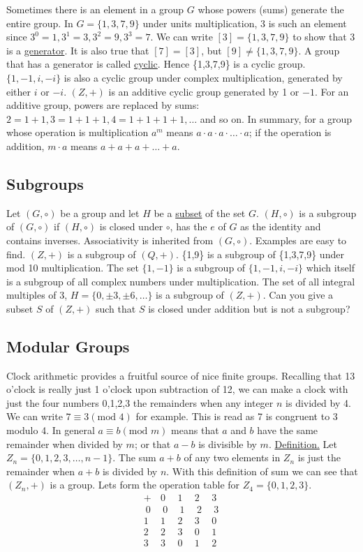 \documentclass[12pt]{book}
\theoremstyle{definition}
\begin{document}
Sometimes there is an element in a group $G$ whose powers (sums) generate the entire group.  In $G=\{1,3,7,9\}$ under units multiplication, 3 is such an element since $3^0=1, 3^1=3, 3^2=9, 3^3=7$.  We can write $[3]=\{1,3,7,9\}$ to show that 3 is a \underline{generator}.  It is also true that $[7]=[3]$, but $[9]\neq\{1,3,7,9\}$.  A group that has a generator is called \underline{cyclic}.  Hence \{1,3,7,9\} is a cyclic group. $\{1,-1,i,-i\}$ is also a cyclic group under complex multiplication, generated by either $i$ or $-i$.  $(Z,+)$ is an additive cyclic group generated by 1 or $-1$.  For an additive group, powers are replaced by sums: $2=1+1, 3=1+1+1, 4=1+1+1+1, \dots$ and so on.  In summary, for a group whose operation is multiplication $a^m$ means $a\cdot a \cdot a\cdot\dots\cdot a$; if the operation is addition, $m\cdot a$ means $a+a+a+\dots+a$.

\subsection{Subgroups}

Let $(G,\circ)$ be a group and let $H$ be a \underline{subset} of the set $G$.  $(H,\circ)$ is a subgroup of $(G,\circ)$ if $(H,\circ)$ is closed under $\circ$, has the $e$ of $G$ as the identity and contains inverses.  Associativity is inherited from $(G,\circ)$.  Examples are easy to find. $(Z,+)$ is a subgroup of $(Q,+)$.  \{1,9\} is a subgroup of \{1,3,7,9\} under mod 10 multiplication.  The set $\{1,-1\}$ is a subgroup of $\{1,-1,i,-i\}$ which itself is a subgroup of all complex numbers under multiplication.  The set of all integral multiples of 3, $H=\{0,\pm3,\pm6,\dots\}$ is a subgroup of $(Z,+)$.  Can you give a subset $S$ of $(Z,+)$ such that $S$ is closed under addition but is not a subgroup?

\subsection{Modular Groups}

Clock arithmetic provides a fruitful source of nice finite groups.  Recalling that 13 o'clock is really just 1 o'clock upon subtraction of 12, we can make a clock with just the four numbers 0,1,2,3 the remainders when any integer $n$ is divided by 4. We can write $7\equiv3(\text{mod }4)$ for example.  This is read as 7 is congruent to 3 modulo 4.  In general $a\equiv b(\text{mod }m)$ means that $a$ and $b$ have the same remainder when divided by $m$; or that $a-b$ is divisible by $m$.
%
\underline{Definition.}  Let $Z_n=\{0,1,2,3,\dots, n-1\}$.  The sum $a+b$ of any two elements in $Z_n$ is just the remainder when $a+b$ is divided by $n$.  With this definition of sum we can see that $(Z_n,+)$ is a group.  Lets form the operation table for $Z_4=\{0,1,2,3\}$.
$$\begin{array}{c|cccc}
+ & 0 & 1& 2 & 3\\
\hline
~0~ & ~0~ & ~1~ & ~2~ & ~3~\\
1 & 1 & 2 & 3 & 0\\
2 & 2 & 3 & 0 & 1\\
3 & 3 & 0 & 1 & 2
\end{array}$$
\end{document}
